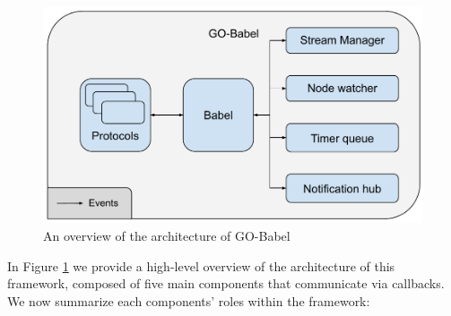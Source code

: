 \begin{figure}[htbp]
    \centering
    \includegraphics[width=\textwidth]{Chapters/Figures/Go-Babel-Overview.pdf}
    \caption{An overview of the architecture of GO-Babel}
    \label{fig:go-babel-overview}
\end{figure}

In Figure \ref{fig:go-babel-overview} we provide a high-level overview of the architecture of this framework, composed of five main components that communicate via callbacks. We now summarize each components' roles within the framework:


